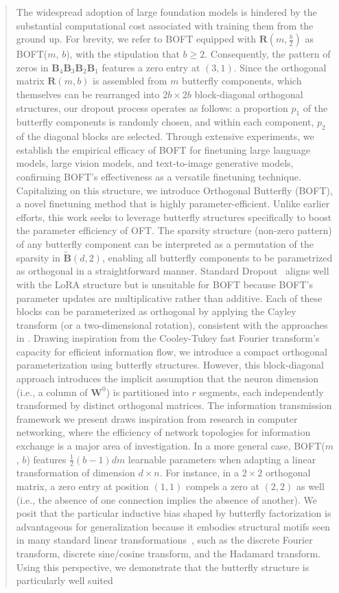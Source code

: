 \begin{abstract}
The widespread adoption of large foundation models is hindered by the substantial computational cost associated with training them from the ground up. For brevity, we refer to BOFT equipped with $\bm{R}(m,\frac{b}{2})$ as BOFT($m$, $b$), with the stipulation that $b \geq 2$. Consequently, the pattern of zeros in $\bm{B}_4\bm{B}_3\bm{B}_2\bm{B}_1$ features a zero entry at $(3,1)$. Since the orthogonal matrix $\bm{R}(m,b)$ is assembled from $m$ butterfly components, which themselves can be rearranged into $2b \times 2b$ block-diagonal orthogonal structures, our dropout process operates as follows: a proportion $p_1$ of the butterfly components is randomly chosen, and within each component, $p_2$ of the diagonal blocks are selected. Through extensive experiments, we establish the empirical efficacy of BOFT for finetuning large language models, large vision models, and text-to-image generative models, confirming BOFT’s effectiveness as a versatile finetuning technique. Capitalizing on this structure, we introduce Orthogonal Butterfly (BOFT), a novel finetuning method that is highly parameter-efficient. Unlike earlier efforts, this work seeks to leverage butterfly structures specifically to boost the parameter efficiency of OFT. The sparsity structure (non-zero pattern) of any butterfly component can be interpreted as a permutation of the sparsity in $\tilde{\bm{B}}(d,2)$, enabling all butterfly components to be parametrized as orthogonal in a straightforward manner. Standard Dropout~\cite{srivastava2014dropout} aligns well with the LoRA structure but is unsuitable for BOFT because BOFT's parameter updates are multiplicative rather than additive. Each of these blocks can be parameterized as orthogonal by applying the Cayley transform (or a two-dimensional rotation), consistent with the approaches in \cite{liu2021orthogonal,qiu2023controlling}. Drawing inspiration from the Cooley-Tukey fast Fourier transform’s capacity for efficient information flow, we introduce a compact orthogonal parameterization using butterfly structures. However, this block-diagonal approach introduces the implicit assumption that the neuron dimension (i.e., a column of $\bm{W}^0$) is partitioned into $r$ segments, each independently transformed by distinct orthogonal matrices. The information transmission framework we present draws inspiration from research in computer networking, where the efficiency of network topologies for information exchange is a major area of investigation. In a more general case, BOFT($m$, $b$) features $\frac{1}{2}(b-1)dm$ learnable parameters when adapting a linear transformation of dimension $d\times n$. For instance, in a $2\times 2$ orthogonal matrix, a zero entry at position $(1,1)$ compels a zero at $(2,2)$ as well (i.e., the absence of one connection implies the absence of another). We posit that the particular inductive bias shaped by butterfly factorization is advantageous for generalization because it embodies structural motifs seen in many standard linear transformations~\cite{dao2019kaleidoscope}, such as the discrete Fourier transform, discrete sine/cosine transform, and the Hadamard transform. Using this perspective, we demonstrate that the butterfly structure is particularly well suited 
\end{abstract}
